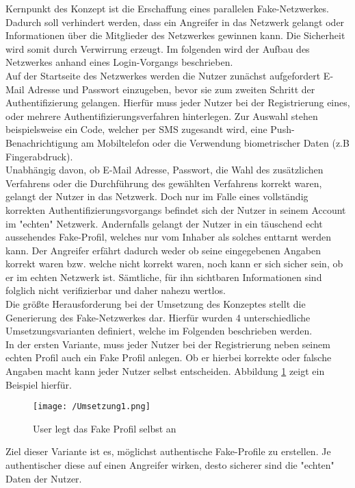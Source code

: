 \documentclass{sigchi}
\begin{document}
Kernpunkt des Konzept ist die Erschaffung eines parallelen Fake-Netzwerkes. Dadurch soll verhindert werden, dass ein Angreifer in das Netzwerk gelangt oder Informationen über die Mitglieder des Netzwerkes gewinnen kann. Die Sicherheit wird somit durch Verwirrung erzeugt. Im folgenden wird der Aufbau des Netzwerkes anhand eines Login-Vorgangs beschrieben. \\
Auf der Startseite des Netzwerkes werden die Nutzer zunächst aufgefordert E-Mail Adresse und Passwort einzugeben, bevor sie zum zweiten Schritt der Authentifizierung gelangen. Hierfür muss jeder Nutzer bei der Registrierung eines, oder mehrere Authentifizierungsverfahren hinterlegen. Zur Auswahl stehen beispielsweise ein Code, welcher per SMS zugesandt wird, eine Push-Benachrichtigung am Mobiltelefon oder die Verwendung biometrischer Daten (z.B Fingerabdruck).\\
Unabhängig davon, ob E-Mail Adresse, Passwort, die Wahl des zusätzlichen Verfahrens oder die Durchführung des gewählten Verfahrens korrekt waren, gelangt der Nutzer in das Netzwerk. Doch nur im Falle eines vollständig korrekten Authentifizierungsvorgangs befindet sich der Nutzer in seinem Account im "echten" Netzwerk. Andernfalls gelangt der Nutzer in ein täuschend echt aussehendes Fake-Profil, welches nur vom Inhaber als solches enttarnt werden kann.  Der Angreifer erfährt dadurch weder ob seine eingegebenen Angaben korrekt waren bzw. welche nicht korrekt waren, noch kann er sich sicher sein, ob er im echten Netzwerk ist. Sämtliche, für ihn sichtbaren Informationen sind folglich nicht verifizierbar und daher nahezu wertlos. \\
Die größte Herausforderung bei der Umsetzung des Konzeptes stellt die Generierung des Fake-Netzwerkes dar. Hierfür wurden 4 unterschiedliche Umsetzungsvarianten definiert, welche im Folgenden beschrieben werden. \\
In der ersten Variante, muss jeder Nutzer bei der Registrierung neben seinem echten Profil auch ein Fake Profil anlegen. Ob er hierbei korrekte oder falsche Angaben macht kann jeder Nutzer selbst entscheiden. Abbildung \ref{fig:Umsetzung1} zeigt ein Beispiel hierfür. 
\begin{figure}[htbp]
\texttt{[image: /Umsetzung1.png]}
\caption{User legt das Fake Profil selbst an}
\label{fig:Umsetzung1}
\end{figure}
Ziel dieser Variante ist es, möglichst authentische Fake-Profile zu erstellen. Je authentischer diese auf einen Angreifer wirken, desto sicherer sind die "echten" Daten der Nutzer. \\
\end{document}
